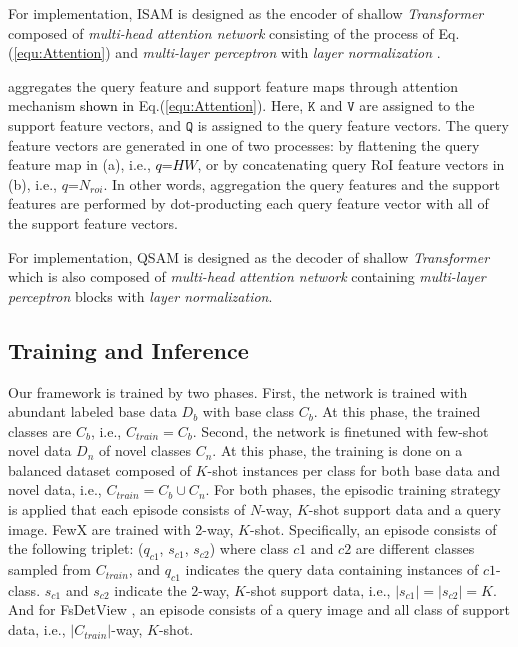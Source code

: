 \documentclass[10pt,twocolumn,letterpaper]{article}
\newcommand{\nj}[1]{\textcolor{black}{#1}}
\newcommand{\hj}[1]{\textcolor{black}{#1}}
\begin{document}
For implementation, ISAM is designed as the encoder of shallow \emph{Transformer} \cite{vaswani2017attention, wang2019learning} composed of \emph{multi-head attention network} consisting of the process of Eq. (\ref{equ:Attention}) and \emph{multi-layer perceptron} with \emph{layer normalization} \cite{ba2016layer}.

\vspace{+0.15cm}
 aggregates the query feature and support feature maps through attention mechanism \nj{shown in} Eq.(\ref{equ:Attention}). Here, $\mathtt{K}$ and $\mathtt{V}$ are assigned to the support feature vectors, and $\mathtt{Q}$ is assigned to the query feature vectors. The query feature vectors are generated in one of two processes: by flattening the query feature map in (a), i.e.,
\hj{$q$=$HW$}, 
or by concatenating query RoI feature vectors in (b), i.e., $q$=$N_{roi}$. In other words, aggregation the query features and the support features are performed by dot-producting each query feature vector with all of the support feature vectors. 

For implementation, QSAM is designed as the decoder of shallow \emph{Transformer} which is also composed of \emph{multi-head attention network} containing \emph{multi-layer perceptron} blocks with \emph{layer normalization}.






\subsection{Training and Inference}
\label{subsec:objective}

 \quad Our framework is trained by two phases. First, the network is trained with abundant labeled base data $D_b$ with base class $C_b$. At this phase, the trained classes are $C_b$, i.e., $C_{train} = C_b$.
Second, the network is finetuned with few-shot novel data $D_n$ of novel classes $C_n$. At this phase, the training is done on a balanced dataset composed of $K$-shot instances per class for both base data and novel data, i.e., $C_{train} = C_{b} \cup C_{n}$.
For both phases, the episodic training strategy is applied that each episode consists of $N$-way, $K$-shot support data and a query image. FewX \cite{fan2020fsod} are trained with 2-way, $K$-shot. Specifically, an episode consists of the following triplet: ($q_{c1}$, $s_{c1}$, $s_{c2}$) where class ${c1}$ and ${c2}$ are different classes sampled from $C_{train}$, and $q_{c1}$ indicates the query data containing instances of ${c1}$-class. $s_{c1}$ and $s_{c2}$ indicate the $2$-way, $K$-shot support data, i.e., $|s_{c1}| = |s_{c2}| = K$. And for FsDetView \cite{xiao2020few}, an episode consists of a query image and all class of support data, i.e., $|C_{train}|$-way, $K$-shot.
\end{document}
